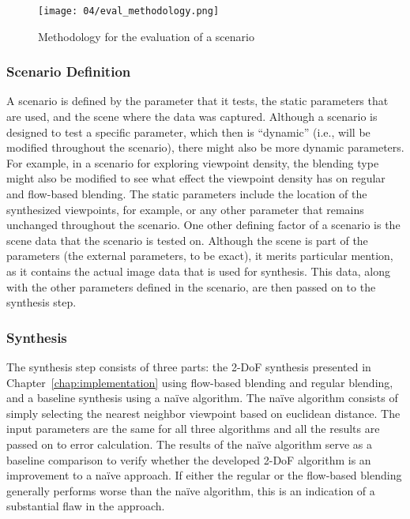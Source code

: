 \begin{figure}
		\centering
		\texttt{[image: 04/eval\_methodology.png]}
		\caption{Methodology for the evaluation of a scenario}
		\label{fig:eval-methodology}
\end{figure}

\subsubsection{Scenario Definition}
A scenario is defined by the parameter that it tests, the static parameters that are used, and the scene where the data was captured. Although a scenario is designed to test a specific parameter, which then is ``dynamic'' (i.e., will be modified throughout the scenario), there might also be more dynamic parameters. For example, in a scenario for exploring viewpoint density, the blending type might also be modified to see what effect the viewpoint density has on regular and flow-based blending. The static parameters include the location of the synthesized viewpoints, for example, or any other parameter that remains unchanged throughout the scenario. One other defining factor of a scenario is the scene data that the scenario is tested on. Although the scene is part of the parameters (the external parameters, to be exact), it merits particular mention, as it contains the actual image data that is used for synthesis. This data, along with the other parameters defined in the scenario, are then passed on to the synthesis step.



\subsubsection{Synthesis}
The synthesis step consists of three parts: the 2-DoF synthesis presented in Chapter~\ref{chap:implementation} using flow-based blending and regular blending, and a baseline synthesis using a na\"ive algorithm.
The na\"ive algorithm consists of simply selecting the nearest neighbor viewpoint based on euclidean distance. The input parameters are the same for all three algorithms and all the results are passed on to error calculation.
The results of the na\"ive algorithm serve as a baseline comparison to verify whether the developed 2-DoF algorithm is an improvement to a na\"ive approach. If either the regular or the flow-based blending generally performs worse than the na\"ive algorithm, this is an indication of a substantial flaw in the approach.

